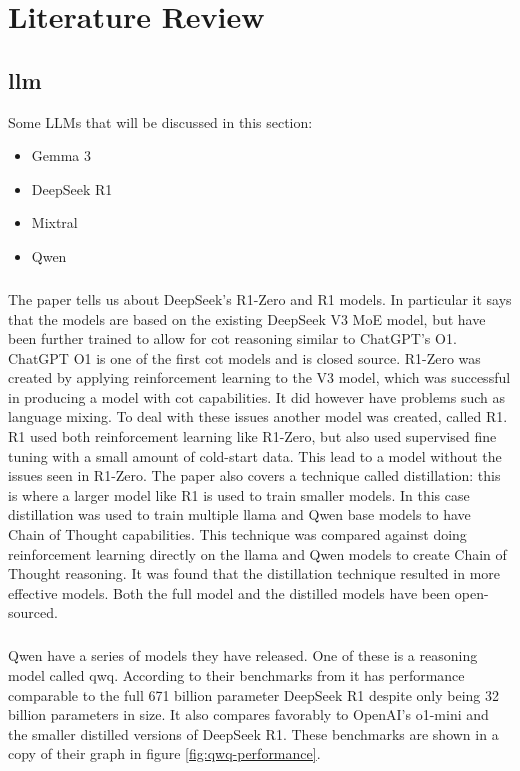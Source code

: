 \chapter{Literature Review}
\section{\acrlong{llm}}
Some LLMs that will be discussed in this section:

\begin{itemize}
\item{Gemma 3}
\item{DeepSeek R1}
\item{Mixtral}
\item{Qwen}
\end{itemize}

\paragraph{} The paper \textcite{deepseek-ai_deepseek-r1_2025} tells us about DeepSeek's R1-Zero and  R1 models. In particular it says that the models are based on the existing DeepSeek V3 MoE model, but have been further trained to allow for \acrfull{cot} reasoning similar to ChatGPT's O1. ChatGPT O1 is one of the first \acrshort{cot} models and is closed source. R1-Zero was created by applying reinforcement learning to the V3 model, which was successful in producing a model with \acrshort{cot} capabilities. It did however have problems such as language mixing. To deal with these issues another model was created, called R1. R1 used both reinforcement learning like R1-Zero, but also used supervised fine tuning with a small amount of cold-start data. This lead to a model without the issues seen in R1-Zero. The paper also covers a technique called distillation: this is where a larger model like R1 is used to train smaller models. In this case distillation was used to train multiple \acrshort{llama} and Qwen base models to have Chain of Thought capabilities. This technique was compared against doing reinforcement learning directly on the \acrshort{llama} and Qwen models to create Chain of Thought reasoning. It was found that the distillation technique resulted in more effective models. Both the full model and the distilled models have been open-sourced.

\paragraph{}Qwen have a series of models they have released. One of these is a reasoning model called qwq. According to their benchmarks from \textcite{} it has performance comparable to the full 671 billion parameter DeepSeek R1 despite only being 32 billion parameters in size. It also compares favorably to OpenAI's o1-mini and the smaller distilled versions of DeepSeek R1. These benchmarks are shown in a copy of their graph in figure \ref{fig:qwq-performance}.

